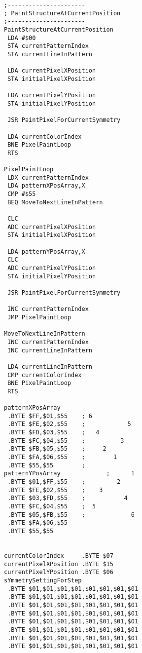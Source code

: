\hspace{0.5cm}
\begin{minipage}[b]{0.33\linewidth}
\begin{lrbox}{\mybox}%
\begin{lstlisting}[basicstyle=\ttfamily\tiny]
;----------------------
; PaintStructureAtCurrentPosition
;----------------------
PaintStructureAtCurrentPosition   
 LDA #$00
 STA currentPatternIndex
 STA currentLineInPattern

 LDA currentPixelXPosition
 STA initialPixelXPosition

 LDA currentPixelYPosition
 STA initialPixelYPosition

 JSR PaintPixelForCurrentSymmetry

 LDA currentColorIndex
 BNE PixelPaintLoop
 RTS 

PixelPaintLoop   
 LDX currentPatternIndex
 LDA patternXPosArray,X
 CMP #$55
 BEQ MoveToNextLineInPattern

 CLC 
 ADC currentPixelXPosition
 STA initialPixelXPosition

 LDA patternYPosArray,X
 CLC 
 ADC currentPixelYPosition
 STA initialPixelYPosition

 JSR PaintPixelForCurrentSymmetry

 INC currentPatternIndex
 JMP PixelPaintLoop

MoveToNextLineInPattern   
 INC currentPatternIndex
 INC currentLineInPattern

 LDA currentLineInPattern
 CMP currentColorIndex
 BNE PixelPaintLoop
 RTS 

patternXPosArray             
 .BYTE $FF,$01,$55    ; 6              
 .BYTE $FE,$02,$55    ;            5   
 .BYTE $FD,$03,$55    ;   4            
 .BYTE $FC,$04,$55    ;          3     
 .BYTE $FB,$05,$55    ;     2          
 .BYTE $FA,$06,$55    ;        1       
 .BYTE $55,$55        ;                
patternYPosArray             ;      1         
 .BYTE $01,$FF,$55    ;         2      
 .BYTE $FE,$02,$55    ;    3           
 .BYTE $03,$FD,$55    ;           4    
 .BYTE $FC,$04,$55    ;  5             
 .BYTE $05,$FB,$55    ;             6 
 .BYTE $FA,$06,$55
 .BYTE $55,$55


currentColorIndex     .BYTE $07
currentPixelXPosition .BYTE $15
currentPixelYPosition .BYTE $06
sYmmetrySettingForStep
 .BYTE $01,$01,$01,$01,$01,$01,$01,$01
 .BYTE $01,$01,$01,$01,$01,$01,$01,$01
 .BYTE $01,$01,$01,$01,$01,$01,$01,$01
 .BYTE $01,$01,$01,$01,$01,$01,$01,$01
 .BYTE $01,$01,$01,$01,$01,$01,$01,$01
 .BYTE $01,$01,$01,$01,$01,$01,$01,$01
 .BYTE $01,$01,$01,$01,$01,$01,$01,$01
 .BYTE $01,$01,$01,$01,$01,$01,$01,$01


\end{lstlisting}
\end{lrbox}
\end{minipage}
